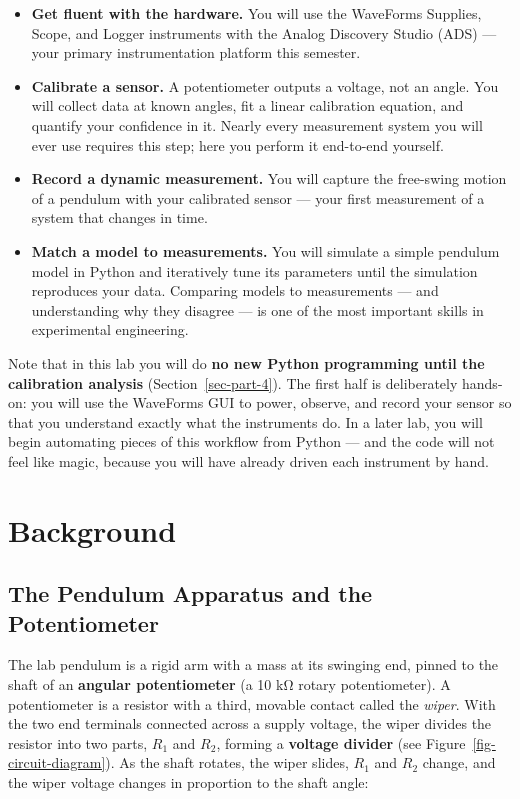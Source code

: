 \documentclass[
  12pt,
  letterpaper,
]{article}
\providecommand{\tightlist}{%
  \setlength{\itemsep}{0pt}\setlength{\parskip}{0pt}}
\begin{document}
\begin{itemize}
\tightlist
\item
  \textbf{Get fluent with the hardware.} You will use the WaveForms
  Supplies, Scope, and Logger instruments with the Analog Discovery
  Studio (ADS) --- your primary instrumentation platform this semester.
\item
  \textbf{Calibrate a sensor.} A potentiometer outputs a voltage, not an
  angle. You will collect data at known angles, fit a linear calibration
  equation, and quantify your confidence in it. Nearly every measurement
  system you will ever use requires this step; here you perform it
  end-to-end yourself.
\item
  \textbf{Record a dynamic measurement.} You will capture the free-swing
  motion of a pendulum with your calibrated sensor --- your first
  measurement of a system that changes in time.
\item
  \textbf{Match a model to measurements.} You will simulate a simple
  pendulum model in Python and iteratively tune its parameters until the
  simulation reproduces your data. Comparing models to measurements ---
  and understanding why they disagree --- is one of the most important
  skills in experimental engineering.
\end{itemize}

Note that in this lab you will do \textbf{no new Python programming
until the calibration analysis} (Section~\ref{sec-part-4}). The first
half is deliberately hands-on: you will use the WaveForms GUI to power,
observe, and record your sensor so that you understand exactly what the
instruments do. In a later lab, you will begin automating pieces of this
workflow from Python --- and the code will not feel like magic, because
you will have already driven each instrument by hand.

\newpage{}

\section{Background}\label{sec-background}

\subsection{The Pendulum Apparatus and the
Potentiometer}\label{the-pendulum-apparatus-and-the-potentiometer}

The lab pendulum is a rigid arm with a mass at its swinging end, pinned
to the shaft of an \textbf{angular potentiometer} (a 10 kΩ rotary
potentiometer). A potentiometer is a resistor with a third, movable
contact called the \emph{wiper}. With the two end terminals connected
across a supply voltage, the wiper divides the resistor into two parts,
\(R_1\) and \(R_2\), forming a \textbf{voltage divider} (see
Figure~\ref{fig-circuit-diagram}). As the shaft rotates, the wiper
slides, \(R_1\) and \(R_2\) change, and the wiper voltage changes in
proportion to the shaft angle:
\end{document}
